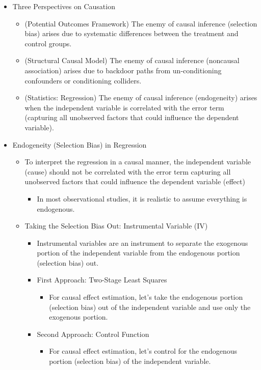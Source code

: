 \documentclass[
]{book}
\providecommand{\tightlist}{%
  \setlength{\itemsep}{0pt}\setlength{\parskip}{0pt}}
\theoremstyle{definition}
\theoremstyle{definition}
\theoremstyle{definition}
\theoremstyle{definition}
\theoremstyle{remark}
\begin{document}
\begin{itemize}
\tightlist
\item
  Three Perspectives on Causation

  \begin{itemize}
  \tightlist
  \item
    (Potential Outcomes Framework) The enemy of causal inference (selection bias) arises due to systematic differences between the treatment and control groups.
  \item
    (Structural Causal Model) The enemy of causal inference (noncausal association) arises due to backdoor paths from un-conditioning confounders or conditioning colliders.
  \item
    (Statistics: Regression) The enemy of causal inference (endogeneity) arises when the independent variable is correlated with the error term (capturing all unobserved factors that could influence the dependent variable).
  \end{itemize}
\item
  Endogeneity (Selection Bias) in Regression

  \begin{itemize}
  \tightlist
  \item
    To interpret the regression in a causal manner, the independent variable (cause) should not be correlated with the error term capturing all unobserved factors that could influence the dependent variable (effect)

    \begin{itemize}
    \tightlist
    \item
      In most observational studies, it is realistic to assume everything is endogenous.
    \end{itemize}
  \item
    Taking the Selection Bias Out: Instrumental Variable (IV)

    \begin{itemize}
    \tightlist
    \item
      Instrumental variables are an instrument to separate the exogenous portion of the independent variable from the endogenous portion (selection bias) out.
    \item
      First Approach: Two-Stage Least Squares

      \begin{itemize}
      \tightlist
      \item
        For causal effect estimation, let's take the endogenous portion (selection bias) out of the independent variable and use only the exogenous portion.
      \end{itemize}
    \item
      Second Approach: Control Function

      \begin{itemize}
      \tightlist
      \item
        For causal effect estimation, let's control for the endogenous portion (selection bias) of the independent variable.
      \end{itemize}
    \end{itemize}
  \end{itemize}
\end{itemize}
\end{document}
